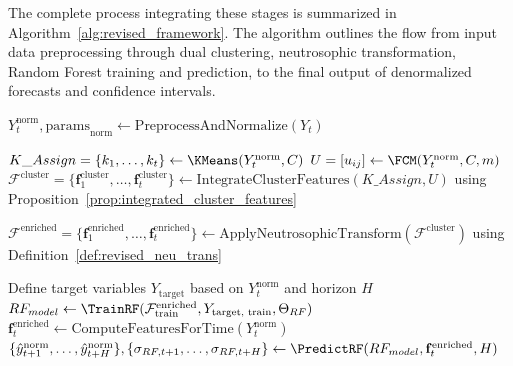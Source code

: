 \documentclass[review,3p,times]{elsarticle}
\begin{document}
The complete process integrating these stages is summarized in Algorithm~\ref{alg:revised_framework}. The algorithm outlines the flow from input data preprocessing through dual clustering, neutrosophic transformation, Random Forest training and prediction, to the final output of denormalized forecasts and confidence intervals.
\begin{algorithm}[t!]
\caption{Neutrosophic Dual Clustering Random Forest Framework}
\label{alg:revised_framework}


\BlankLine
{}
$Y_t^{\text{norm}}, \text{params}_{\text{norm}} \leftarrow \text{PreprocessAndNormalize}(Y_t)$\;

\BlankLine
{}
$K\_Assign = \{k_1, \dots, k_t\} \leftarrow \KMeans(Y_t^{\text{norm}}, C)$\;
$U = [u_{ij}] \leftarrow \FCM(Y_t^{\text{norm}}, C, m)$\;
$\mathcal{F}^{\text{cluster}} = \{\mathbf{f}_1^{\text{cluster}}, \dots, \mathbf{f}_t^{\text{cluster}}\} \leftarrow \text{IntegrateClusterFeatures}(K\_Assign, U)$ using Proposition~\ref{prop:integrated_cluster_features}\;

\BlankLine
{}
$\mathcal{F}^{\text{enriched}} = \{\mathbf{f}_1^{\text{enriched}}, \dots, \mathbf{f}_t^{\text{enriched}}\} \leftarrow \text{ApplyNeutrosophicTransform}(\mathcal{F}^{\text{cluster}})$ using Definition~\ref{def:revised_neu_trans}\;

\BlankLine
{}
Define target variables $Y_{\text{target}}$ based on $Y_t^{\text{norm}}$ and horizon $H$\;
$RF_{model} \leftarrow \TrainRF(\mathcal{F}^{\text{enriched}}_{\text{train}}, Y_{\text{target, train}}, \Theta_{RF})$\;
$\mathbf{f}_t^{\text{enriched}} \leftarrow \text{ComputeFeaturesForTime}(Y_t^{\text{norm}})$\; %
$\{\hat{y}_{t+1}^{\text{norm}}, \dots, \hat{y}_{t+H}^{\text{norm}}\}, \{\sigma_{RF, t+1}, \dots, \sigma_{RF, t+H}\} \leftarrow \PredictRF(RF_{model}, \mathbf{f}_t^{\text{enriched}}, H)$\; %


\end{algorithm}
\end{document}

